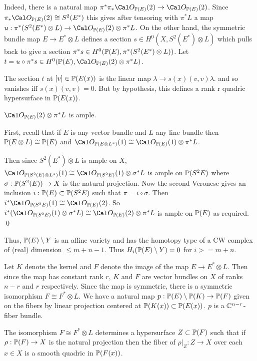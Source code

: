 Indeed, there is a natural map 
$\pi^* \pi_{*} \co_{\ppp(E)}(2) \to \co_{\ppp(E)}(2)$. Since
$\pi_{*} \co_{\ppp(E)}(2) \cong S^2(E^*)$ this gives after tensoring with
$\pi^{*}L$ a map $u: \pi^* ( S^2(E^*) \otimes L) \to
 \co_{\ppp(E)}(2) \otimes \pi^* L$.
On the other hand, the symmetric bundle map $E \to E^{*} \otimes L$ defines
a section $s \in H^0(X,S^2(E^*) \otimes L)$ which pulls back to give
a section $\pi^*s \in H^0(\Bbb P(E), \pi^* ( S^2(E^*) \otimes L))$. Let 
$t = u \circ \pi^*s \in  H^0(\ppp(E), \co_{\ppp(E)}(2) \otimes \pi^{*}L)$.

The section $t$ at $[v] \in \Bbb P(E(x))$ is the linear map
$\lambda \to s(x)(v,v) \lambda$. and so vanishes iff
$s(x)(v,v) = 0$. But by hypothesis, this defines a rank r quadric hypersurface
in $\Bbb P(E(x))$.

 $\co_{\ppp(E)}(2) \otimes \pi^{*}L$ is ample.
\endproclaim

First, recall that if $E$ is any vector bundle and $L$ any line bundle
then  $\Bbb P(E \otimes L) \cong \Bbb P(E)$ and 
$\co_{\ppp(E \otimes L^*)}(1) \cong \co_{\ppp(E)}(1) \otimes \pi^*L$.

Then since $S^2(E^*) \otimes L$ is ample on $X$,
$\co_{\ppp(S^2(E) \otimes L^*)}(1) \cong \co_{\ppp(S^2 E)}(1)
 \otimes \sigma^* L$ is ample on $\Bbb P(S^2 E)$ where
$\sigma: \Bbb P(S^2(E)) \to X$ is the natural projection.
Now the second Veronese gives an inclusion $i: \Bbb P(E) \subset 
\Bbb P(S^2 E)$ such that $\pi = i \circ \sigma$. Then
$i^* \co_{\ppp(S^2 E)}(1) \cong \co_{\ppp(E)}(2)$. So
$i^* ( \co_{\ppp(S^2 E)}(1) \otimes \sigma^* L) \cong \co_{\ppp(E)}(2)
\otimes \pi^* L$ is ample on $\Bbb P(E)$ as required.
\qed
\enddemo

Thus, $\Bbb P(E) \setminus Y$ is an affine variety and has
the homotopy type of a CW complex of (real) dimension $\le m+n -1$.
Thus $H_i(\Bbb P(E) \setminus Y) = 0$ for $i >= m+n$.

Let $K$ denote the kernel and $F$ denote the image of the map
$E \to E^* \otimes L$. Then since the map has constant rank $r$,
$K$ and $F$ are vector bundles on $X$ of ranks $n-r$ and $r$ respectively.
Since the map
is symmetric, there is a symmetric isomorphism $F \cong F^* \otimes L$.
We have a natural map
$p: \Bbb P(E) \setminus \Bbb P(K) \to \Bbb P(F)$ given
on the fibers by linear projection  centered at $\Bbb P(K(x)) \subset 
\Bbb P(E(x))$. $p$ is a $\Bbb C^{n-r}$- fiber bundle.

The isomorphism $F \cong F^* \otimes L$ determines a
 hypersurface $Z \subset \Bbb P(F)$
such that if $\rho: \Bbb P(F) \to X$ is the natural projection then
the fiber of  $\rho \vert_Z : Z \to X$ over each $x \in X$
is a smooth quadric in $\Bbb P(F(x))$.


